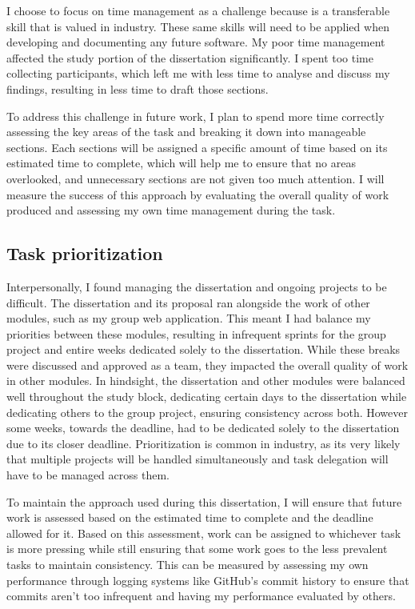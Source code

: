 \documentclass[article]{IEEEtran}
\begin{document}
                I choose to focus on time management as a challenge because is a transferable skill that is valued in industry. These same skills will need to be applied when developing and documenting any future software. My poor time management affected the study portion of the dissertation significantly. I spent too time collecting participants, which left me with less time to analyse and discuss my findings, resulting in less time to draft those sections. 
    
                To address this challenge in future work, I plan to spend more time correctly assessing the key areas of the task and breaking it down into manageable sections. Each sections will be assigned a specific amount of time based on its estimated time to complete, which will help me to ensure that no areas overlooked, and unnecessary sections are not given too much attention. I will measure the success of this approach by evaluating the overall quality of work produced and assessing my own time management during the task.

            \subsection{Task prioritization}
                Interpersonally, I found managing the dissertation and ongoing projects to be difficult. The dissertation and its proposal ran alongside the work of other modules, such as my group web application. This meant I had balance my priorities between these modules, resulting in infrequent sprints for the group project and entire weeks dedicated solely to the dissertation. While these breaks were discussed and approved as a team, they impacted the overall quality of work in other modules. In hindsight, the dissertation and other modules were balanced well throughout the study block, dedicating certain days to the dissertation while dedicating others to the group project, ensuring consistency across both. However some weeks, towards the deadline, had to be dedicated solely to the dissertation due to its closer deadline. Prioritization is common in industry,  as its very likely that multiple projects will be handled simultaneously and task delegation will have to be managed across them.
    
                To maintain the approach used during this dissertation, I will ensure that future work is assessed based on the estimated time to complete and the deadline allowed for it. Based on this assessment, work can be assigned to whichever task is more pressing while still ensuring that some work goes to the less prevalent tasks to maintain consistency. This can be measured by assessing my own performance through logging systems like GitHub's commit history to ensure that commits aren't too infrequent and having my performance evaluated by others.
\end{document}
